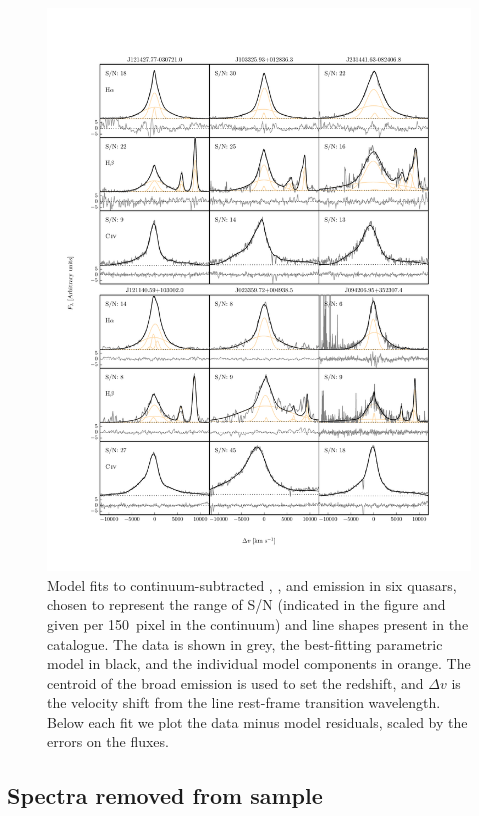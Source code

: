 \begin{figure}
    \includegraphics[width=\textwidth]{figures/chapter03/example_grid.pdf} 
    \caption{Model fits to continuum-subtracted \hans, \hbns, and  emission in six quasars, chosen to represent the range of S/N (indicated in the figure and given per 150\kms\, pixel in the continuum) and line shapes present in the catalogue. The data is shown in grey, the best-fitting parametric model in black, and the individual model components in orange. The centroid of the broad \ha emission is used to set the redshift, and $\Delta{v}$ is the velocity shift from the line rest-frame transition wavelength. Below each fit we plot the data minus model residuals, scaled by the errors on the fluxes.} 
    \label{fig:examplegrid}
\end{figure}


\subsection{Spectra removed from sample}
\label{sec:flagged_spectra}

